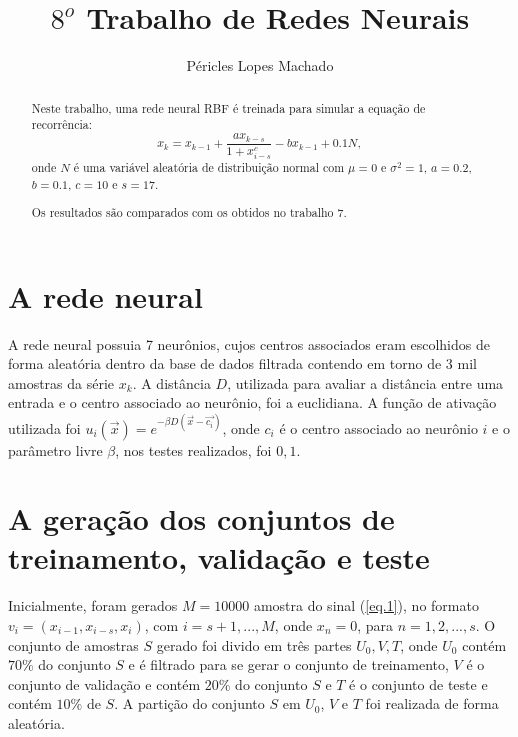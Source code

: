 \documentclass[10pt,journal,letterpaper,compsoc]{IEEEtran}
\title{$8^o$ Trabalho de Redes Neurais}
\author{Péricles Lopes Machado}
\newcommand{\fra}[2]{
	\displaystyle \frac{{#1}}{{#2}} 
}
\begin{document}
\maketitle

\begin{abstract}

Neste trabalho, uma rede neural RBF é treinada para simular a equação de recorrência:
\begin{equation}
x_k = x_{k-1} + \fra{a x_{k-s} } { 1 + x_{i-s} ^ c} - b x_{k-1} + 0.1 N ,
\label{eq.1}
\end{equation}
onde $N$ é uma variável aleatória
de distribuição normal com $\mu = 0$ e $\sigma^2 = 1$, $a = 0.2$,
$b = 0.1$, $c = 10$ e $s = 17$.

Os resultados são comparados com os obtidos no trabalho 7.

\end{abstract}

\section{A rede neural}

A rede neural possuia 7 neurônios, cujos centros associados eram escolhidos de forma aleatória
dentro da base de dados filtrada contendo em torno de 3 mil amostras da série $x_k$. A distância $D$,
utilizada para avaliar a distância entre uma entrada e o centro associado ao neurônio, foi a euclidiana.
A função de ativação utilizada foi $u_i(\vec{x}) =  e^{-\beta  D(\vec{x} - \vec{c_i})}$, onde $c_i$ é
o centro associado ao neurônio $i$ e o parâmetro livre $\beta$, nos testes realizados, foi $0,1$.

\section{A geração dos conjuntos de treinamento, validação e teste \label{secao.gera.db}}

Inicialmente, foram gerados $M=10000$ amostra do sinal (\ref{eq.1}), no formato
$v_i = (x_{i-1},x_{i-s},x_{i})$, 
com $i = s+1, ..., M$, onde $x_{n} = 0$, para $n = 1, 2, ..., s$.
O conjunto de amostras $S$ gerado foi divido em três partes $U_0, V, T$, onde $U_0$ contém
$70\%$ do conjunto $S$ e é filtrado para se gerar
o conjunto de treinamento, $V$ é o conjunto de validação e contém $20 \%$ do conjunto $S$ e $T$
é o conjunto de teste e contém $10 \%$ de $S$. A partição do conjunto $S$ em
$U_0$, $V$ e $T$
foi realizada de forma aleatória.
\end{document}
